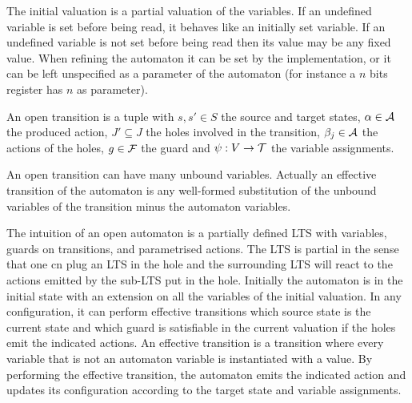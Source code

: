 \documentclass{article}
\begin{document}
The initial valuation is a partial valuation of the variables.
If an undefined variable is set before being read, it behaves like an initially set variable.
If an undefined variable is not set before being read then its value may be any fixed value.
When refining  the automaton it can be set by the implementation, or it can be left unspecified as a parameter of the automaton (for instance a \(n\) bits register has \(n\) as parameter).
\begin{defi}
An open transition is a tuple \nmm{\OTg} with \(s, s' \in S\) the source and target states, \(\alpha \in \mathcal{A}\) the produced action, \(J' \subseteq J\) the holes involved in the transition, \(\beta_j \in \mathcal{A}\) the actions of the holes, \(g \in {\mathcal{F}}\) the guard and \(\psi: V \to {\mathcal{T}}\) the variable assignments.
\end{defi}
An open transition can have many unbound variables.
Actually an effective transition of the automaton is any well-formed substitution of the unbound variables of the transition minus the automaton variables.

The intuition of an open automaton is a partially defined LTS with variables, guards on transitions, and parametrised actions. The LTS is partial in the sense that one cn plug an LTS in the hole and the surrounding LTS will react to the actions emitted by the sub-LTS put in the hole.
Initially the automaton is in the initial state with an extension on all the variables of the initial valuation.
In any configuration, it can perform effective transitions which source state is the current state and which guard is satisfiable in the current valuation if the holes emit the indicated actions.
An effective transition is a transition where every variable that is not an automaton variable is instantiated with a value.
By performing the effective transition, the automaton emits the indicated action and updates its configuration according to the target state and variable assignments.
\end{document}
